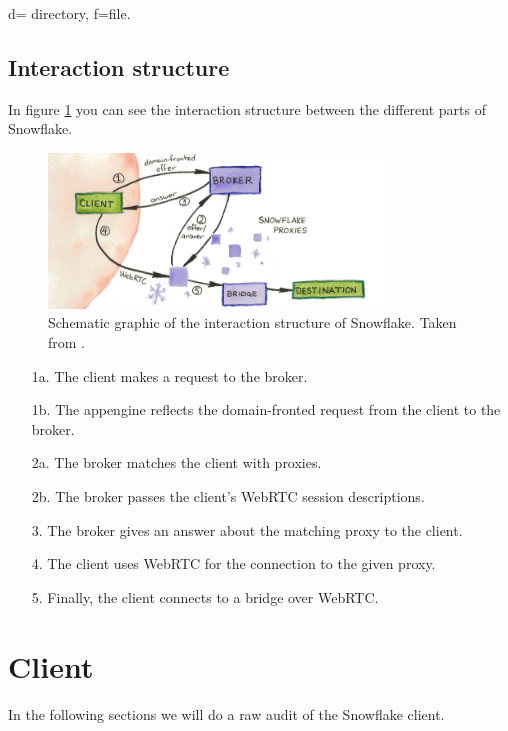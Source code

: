 \documentclass{amsart}
\theoremstyle{definition}
\theoremstyle{remark}
\numberwithin{equation}{section}
\begin{document}
d= directory, f=file.
\subsection{Interaction structure}
\label{ss:interactionstructure}
In figure \ref{fig:interactionstructure} you can see the interaction structure between the different parts of Snowflake.

\begin{figure}[H]
\centering
    \includegraphics[width=0.8\textwidth]{images/snowflake-schematic.png}
\caption{Schematic graphic of the interaction structure of Snowflake. Taken from \cite{SnowflakeSchematic}.}
\label{fig:interactionstructure}
\end{figure}

\begin{itemize}
    \item [1a.] The client makes a request to the broker.
    \item [1b.] The appengine reflects the domain-fronted request from the client to the broker.
    \item [2a.] The broker matches the client with proxies.
    \item [2b.] The broker passes the client's WebRTC session descriptions.
    \item [3.] The broker gives an answer about the matching proxy to the client.
    \item [4.] The client uses WebRTC for the connection to the given proxy.
    \item [5.] Finally, the client connects to a bridge over WebRTC.
\end{itemize}
\section{Client}
\label{s:client}
In the following sections we will do a raw audit of the Snowflake client.
\end{document}
